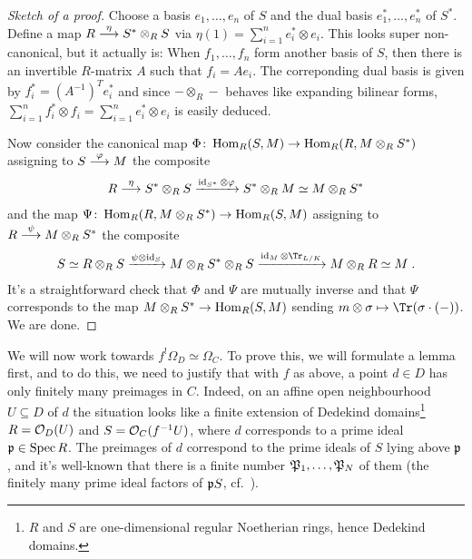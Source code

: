 \documentclass[a4paper,parskip=half,numbers=enddot, DIV=12]{scrreprt}
\begin{document}
\begin{proof}[Sketch of a proof]
	Choose a basis $e_1,\ldots, e_n$ of $S$ and the dual basis $e_1^*,\ldots,e_n^*$ of $S^*$. Define a map $R\morphism[\eta]S^*\otimes_RS$ via $\eta(1)=\sum_{i=1}^ne_i^*\otimes e_i$. This looks super non-canonical, but it actually is: When $f_1,\ldots,f_n$ form another basis of $S$, then there is an invertible $R$-matrix $A$ such that $f_i=Ae_i$. The correponding dual basis is given by $f_i^*=(A^{-1})^Te_i^*$ and since $-\otimes_R-$ behaves like expanding bilinear forms, $\sum_{i=1}^nf_i^*\otimes f_i=\sum_{i=1}^ne_i^*\otimes e_i$ is easily deduced. 
	
	Now consider the canonical map $\Phi\colon \Hom_R(S,M)\morphism\Hom_R(R,M\otimes_RS^*)$ assigning to $S\morphism[\phi]M$ the composite
	\begin{align*}
		R\morphism[\eta]S^*\otimes_RS\xrightarrow{\id_{S^*}\otimes \phi} S^*\otimes_RM\simeq M\otimes_RS^*
	\end{align*}
	and the map $\Psi\colon \Hom_R(R,M\otimes_RS^*)\morphism\Hom_R(S,M)$ assigning to $R\morphism[\psi]M\otimes_RS^*$ the composite
	\begin{align*}
		S\simeq R\otimes_RS\xrightarrow{\psi\otimes\id_S}M\otimes_RS^*\otimes_RS\xrightarrow{\id_M\otimes \Tr_{L/K}}M\otimes_RR\simeq M\;.
	\end{align*}
	It's a straightforward check that $\Phi$ and $\Psi$ are mutually inverse and that $\Psi$ corresponds to the map $M\otimes_RS^*\morphism\Hom_R(S,M)$ sending $m\otimes\sigma\mapsto \Tr(\sigma\cdot(-))$. We are done.	
\end{proof}
We will now work towards $f^!\Omega_D\simeq \Omega_C$. To prove this, we will formulate a lemma first, and to do this, we need to justify that with $f$ as above, a point $d\in D$ has only finitely many preimages in $C$. Indeed, on an affine open neighbourhood $U\subseteq D$ of $d$ the situation looks like a finite extension of Dedekind domains\footnote{$R$ and $S$ are one-dimensional regular Noetherian rings, hence Dedekind domains.} $R=\mathcal{O}_D(U)$ and $S=\mathcal{O}_C(f^{-1}U)$, where $d$ corresponds to a prime ideal $\mathfrak{p}\in\operatorname{Spec} R$. The preimages of $d$ correspond to the prime ideals of $S$ lying above $\mathfrak{p}$, and it's well-known that there is a finite number $\mathfrak{P}_1,\ldots,\mathfrak{P}_N$ of them (the finitely many prime ideal factors of $\mathfrak{p} S$, cf.\ \cite[Ch.~I, \S 8]{NEUKIRCH}).
\end{document}
